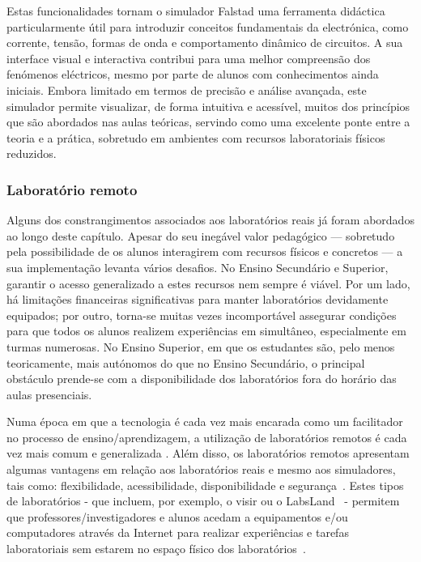 Estas funcionalidades tornam o simulador Falstad uma ferramenta didáctica particularmente útil para introduzir conceitos fundamentais da electrónica, como corrente, tensão, formas de onda e comportamento dinâmico de circuitos. A sua interface visual e interactiva contribui para uma melhor compreensão dos fenómenos eléctricos, mesmo por parte de alunos com conhecimentos ainda iniciais. Embora limitado em termos de precisão e análise avançada, este simulador permite visualizar, de forma intuitiva e acessível, muitos dos princípios que são abordados nas aulas teóricas, servindo como uma excelente ponte entre a teoria e a prática, sobretudo em ambientes com recursos laboratoriais físicos reduzidos.

\subsubsection{Laboratório remoto}
\label{sec: remotelaboratory}
Alguns dos constrangimentos associados aos laboratórios reais já foram abordados ao longo deste capítulo. Apesar do seu inegável valor pedagógico — sobretudo pela possibilidade de os alunos interagirem com recursos físicos e concretos — a sua implementação levanta vários desafios. No Ensino Secundário e Superior, garantir o acesso generalizado a estes recursos nem sempre é viável. Por um lado, há limitações financeiras significativas para manter laboratórios devidamente equipados; por outro, torna-se muitas vezes incomportável assegurar condições para que todos os alunos realizem experiências em simultâneo, especialmente em turmas numerosas. No Ensino Superior, em que os estudantes são, pelo menos teoricamente, mais autónomos do que no Ensino Secundário, o principal obstáculo prende-se com a disponibilidade dos laboratórios fora do horário das aulas presenciais.

Numa época em que a tecnologia é cada vez mais encarada como um facilitador no processo de ensino/aprendizagem, a utilização de laboratórios remotos é cada vez mais comum e generalizada \cite{RemoteLabsImpactVISIR}. Além disso, os laboratórios remotos apresentam algumas vantagens em relação aos laboratórios reais e mesmo aos simuladores, tais como: flexibilidade, acessibilidade, disponibilidade e segurança~\cite{RemoteLabsImpactVISIR}. Estes tipos de laboratórios - que incluem, por exemplo, o \acrshort{visir} ou o LabsLand~\cite{labsland} - permitem que professores/investigadores e alunos acedam a equipamentos e/ou computadores através da Internet para realizar experiências e tarefas laboratoriais sem estarem no espaço físico dos laboratórios~\cite{ExperiencesRemoteLab}.

